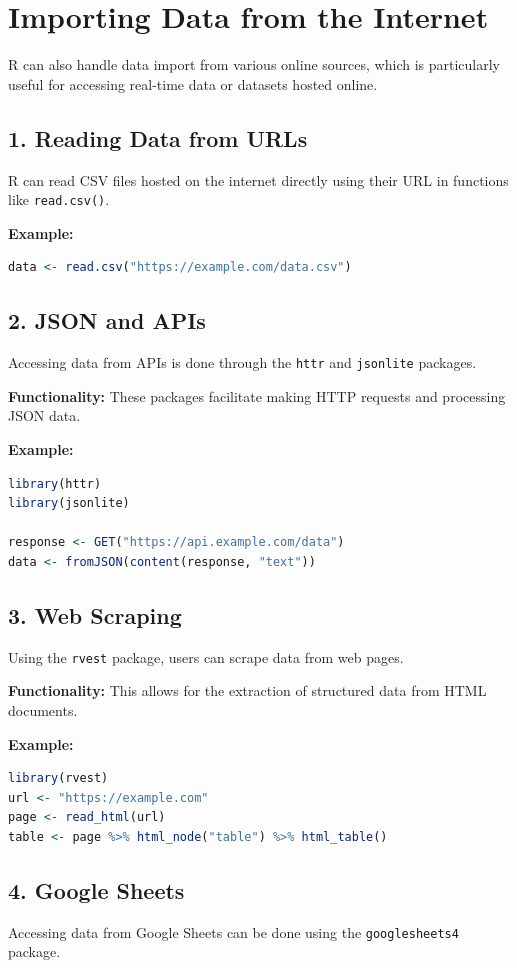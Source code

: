 \documentclass[10pt]{book}
\begin{document}
\section{Importing Data from the Internet}
R can also handle data import from various online sources, which is particularly useful for accessing real-time data or datasets hosted online.

\subsection{1. Reading Data from URLs}
R can read CSV files hosted on the internet directly using their URL in functions like \texttt{read.csv()}.

\textbf{Example:}
\begin{lstlisting}[language=R]
data <- read.csv("https://example.com/data.csv")
\end{lstlisting}

\subsection{2. JSON and APIs}
Accessing data from APIs is done through the \texttt{httr} and \texttt{jsonlite} packages.

\textbf{Functionality:} These packages facilitate making HTTP requests and processing JSON data.

\textbf{Example:}
\begin{lstlisting}[language=R]
library(httr)
library(jsonlite)

response <- GET("https://api.example.com/data")
data <- fromJSON(content(response, "text"))
\end{lstlisting}

\subsection{3. Web Scraping}
Using the \texttt{rvest} package, users can scrape data from web pages.

\textbf{Functionality:} This allows for the extraction of structured data from HTML documents.

\textbf{Example:}
\begin{lstlisting}[language=R]
library(rvest)
url <- "https://example.com"
page <- read_html(url)
table <- page %>% html_node("table") %>% html_table()
\end{lstlisting}

\subsection{4. Google Sheets}
Accessing data from Google Sheets can be done using the \texttt{googlesheets4} package.
\end{document}
